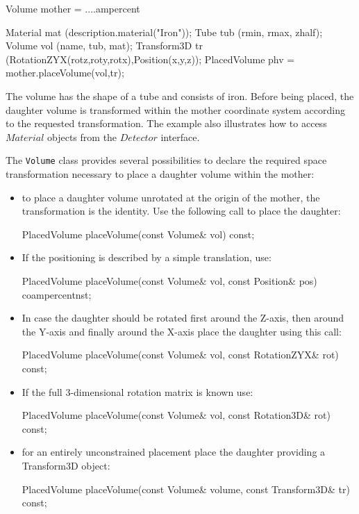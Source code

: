 \documentclass[10pt,a4paper]{article}
\begin{document}
\begin{code}
  Volume       mother = ....ampercent

  Material     mat    (description.material("Iron"));
  Tube         tub    (rmin, rmax, zhalf);
  Volume       vol    (name, tub, mat);
  Transform3D  tr     (RotationZYX(rotz,roty,rotx),Position(x,y,z));
  PlacedVolume phv = mother.placeVolume(vol,tr);
\end{code}

\noindent
The volume has the shape of a tube and consists of iron.
Before being placed, the daughter volume is transformed within
the mother coordinate system according to the requested transformation.
The example also illustrates how to access $Material$ objects from the
$Detector$ interface.

\noindent
The {\tt{Volume}} class provides several possibilities to declare
the required space transformation necessary to place a daughter volume 
within the mother:
\begin{itemize}\itemcompact
\item to place a daughter volume unrotated at the origin of the mother, the 
transformation is the identity. Use the following call to place the daughter:
\begin{unnumberedcode}
PlacedVolume placeVolume(const Volume& vol)  const;
\end{unnumberedcode}
\item If the positioning is described by a simple translation, use:
\begin{unnumberedcode}
PlacedVolume placeVolume(const Volume& vol, const Position& pos)  coampercentnst;
\end{unnumberedcode}
\item In case the daughter should be rotated first around the Z-axis, 
       then around the Y-axis and finally around the X-axis place the daughter 
       using this call:
\begin{unnumberedcode}
PlacedVolume placeVolume(const Volume& vol, const RotationZYX& rot)  const;
\end{unnumberedcode}
\item If the full 3-dimensional rotation matrix is known use:
\begin{unnumberedcode}
PlacedVolume placeVolume(const Volume& vol, const Rotation3D& rot)  const;
\end{unnumberedcode}
\item for an entirely unconstrained placement place the daughter providing
      a Transform3D object:
\begin{unnumberedcode}
PlacedVolume placeVolume(const Volume& volume, const Transform3D& tr)  const;
\end{unnumberedcode}
\end{itemize}
\end{document}

